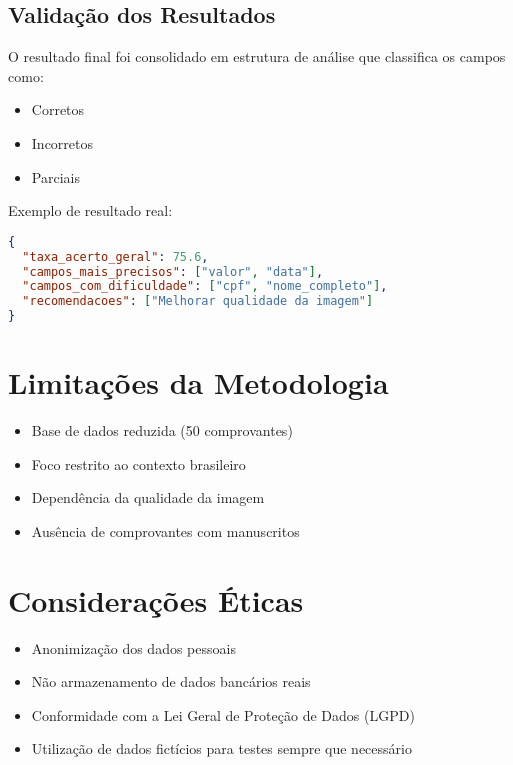 \subsection{Validação dos Resultados}

O resultado final foi consolidado em estrutura de análise que classifica os campos como:

\begin{itemize}
    \item Corretos
    \item Incorretos
    \item Parciais
\end{itemize}

Exemplo de resultado real:

\begin{lstlisting}[language=json]
{
  "taxa_acerto_geral": 75.6,
  "campos_mais_precisos": ["valor", "data"],
  "campos_com_dificuldade": ["cpf", "nome_completo"],
  "recomendacoes": ["Melhorar qualidade da imagem"]
}
\end{lstlisting}

\section{Limitações da Metodologia}

\begin{itemize}
    \item Base de dados reduzida (50 comprovantes)
    \item Foco restrito ao contexto brasileiro
    \item Dependência da qualidade da imagem
    \item Ausência de comprovantes com manuscritos
\end{itemize}

\section{Considerações Éticas}

\begin{itemize}
    \item Anonimização dos dados pessoais
    \item Não armazenamento de dados bancários reais
    \item Conformidade com a Lei Geral de Proteção de Dados (LGPD)
    \item Utilização de dados fictícios para testes sempre que necessário
\end{itemize}